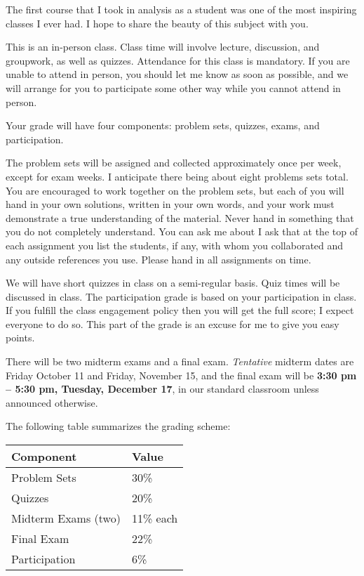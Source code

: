 \documentclass{amsart}
\begin{document}
The first course that I took in analysis as a student was one of the most inspiring classes I ever had. I hope to share the beauty of this subject with you.




\smallskip

This is an in-person class. Class time will involve lecture, discussion, and groupwork, as well as quizzes. Attendance for this class is mandatory. If you are unable to attend in person, you should let me know as soon as possible, and we will arrange for you to participate some other way while you cannot attend in person.



 Your grade will have four components: problem sets, quizzes, exams, and participation. 

The problem sets will be assigned and collected approximately once per week, except for exam weeks. I anticipate there being about eight problems sets total.
You are encouraged to work together on
the problem sets, but each of you will hand in 
your own solutions, written in your own words, and your work must
demonstrate a true understanding of the material. Never hand in
something that you do not completely understand. You can ask me about I ask that at the top of each assignment you list the students, if any, with whom you collaborated and any outside references you use. 
Please hand in all assignments on time.


We will have short quizzes in class on a semi-regular basis. Quiz times will be discussed in class. The participation grade is based on your participation in class. If you fulfill the class engagement policy then you will get the full score; I expect everyone to do so. This part of the grade is an excuse for me to give you easy points.

There will be two midterm exams and a final exam. \emph{Tentative} midterm dates are Friday October 11 and Friday, November 15, and the final exam will be \textbf{3:30 pm -- 5:30 pm, Tuesday, December 17}, in our standard classroom unless announced otherwise.

\newpage

\noindent The following table summarizes the grading scheme:



\bigskip

\medskip

\begin{tabular}{|l|l|}
\hline
Component & Value \\
\hline \hline
Problem Sets & 30\% \\
\hline
Quizzes & 20\% \\
\hline
Midterm Exams (two) &  11\% each \\
\hline
Final Exam & 22\% \\
\hline
Participation & 6\%\\
\hline
\end{tabular}
\end{document}
